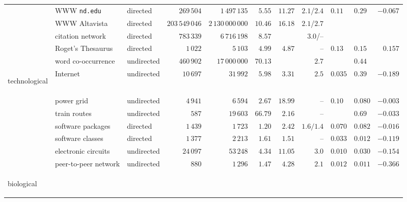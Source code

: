 \begin{center}
{\begin{tabular}{l|l|l|r|r|r|r|r|l|l|r|}
 & WWW \texttt{nd.edu}       & directed   & $269\,504$      & $1\,497\,135$      & $5.55$  & $11.27$ & $2.1$/$2.4$
 & $0.11$  & $0.29$  & $-0.067$  \\
 & WWW Altavista             & directed   & $203\,549\,046$ & $2\,130\,000\,000$ & $10.46$ & $16.18$ & $2.1$/$2.7$
 &         &         &           \\
 & citation network          & directed   & $783\,339$      & $6\,716\,198$      & $8.57$  &         & $3.0$/--
 &         &         &           \\
 & Roget's Thesaurus         & directed   & $1\,022$        & $5\,103$           & $4.99$  & $4.87$  & --
 & $0.13$  & $0.15$  & $0.157$   \\
 & word co-occurrence        & undirected & $460\,902$      & $17\,000\,000$     & $70.13$ &         & $2.7$
 &         & $0.44$  &           \\
\hline
\begin{rotate}{90}
\hbox{\hspace{-6.5em}technological}
\end{rotate}
 & Internet                  & undirected & $10\,697$       & $31\,992$          & $5.98$  & $3.31$  & $2.5$
 & $0.035$ & $0.39$  & $-0.189$  \\
 & power grid                & undirected & $4\,941$        & $6\,594$           & $2.67$  & $18.99$ & --
 & $0.10$  & $0.080$ & $-0.003$  \\
 & train routes              & undirected & $587$           & $19\,603$          & $66.79$ & $2.16$  & --
 &         & $0.69$  & $-0.033$  \\
 & software packages         & directed   & $1\,439$        & $1\,723$           & $1.20$  & $2.42$  & $1.6/1.4$
 & $0.070$ & $0.082$ & $-0.016$  \\
 & software classes          & directed   & $1\,377$        & $2\,213$           & $1.61$  & $1.51$  & --
 & $0.033$ & $0.012$ & $-0.119$  \\
 & electronic circuits       & undirected & $24\,097$       & $53\,248$          & $4.34$  & $11.05$ & $3.0$
 & $0.010$ & $0.030$ & $-0.154$  \\
 & peer-to-peer network      & undirected & $880$           & $1\,296$           & $1.47$  & $4.28$  & $2.1$
 & $0.012$ & $0.011$ & $-0.366$  \\
\hline
\begin{rotate}{90}
\hbox{\hspace{-4.4em}biological}
\end{rotate}

\end{tabular}}
\end{center}
